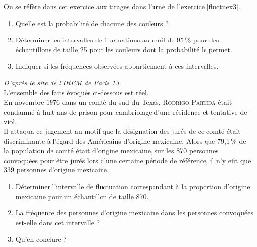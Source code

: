 \begin{exo}
 On se r\'ef\`ere dans cet exercice aux tirages dans l'urne de l'exercice \ref{fluctuex3}.
 \begin{enumerate}
  \item Quelle est la probabilit\'e de chacune des couleurs ?
  \item D\'eterminer les intervalles de fluctuations au seuil de 95\,\% pour des \'echantillons de taille 25 pour les couleurs dont la probabilit\'e le permet.
  \item Indiquer si les fr\'equences observ\'ees appartiennent \`a ces intervalles.
 \end{enumerate}

\end{exo}

\sautpage

\begin{exo}
 \emph{D'apr\`es le site de l'\href{http://dutarte.club.fr/Sitestat/affaire\%20castaneda.htm}{IREM de Paris 13}.}\\
L'ensemble des faits \'evoqu\'es ci-dessous est r\'eel.\\
En novembre 1976 dans un comt\'e du sud du Texas, \textsc{Rodrigo Partida} \'etait condamn\'e \`a huit ans de prison pour cambriolage d'une r\'esidence et tentative de viol.\\
Il attaqua ce jugement au motif que la d\'esignation des jur\'es de ce comt\'e \'etait discriminante \`a l'\'egard des Am\'ericains d'origine mexicaine. Alors que 79,1\,\% de la population de comt\'e \'etait d'origine mexicaine, sur les 870 personnes convoqu\'ees pour \^etre jur\'es lors d'une certaine p\'eriode de r\'ef\'erence, il n'y eût que 339 personnes d'origine mexicaine.
\begin{enumerate}
  \item D\'eterminer l'intervalle de fluctuation correspondant \`a la proportion d'origine mexicaine pour un \'echantillon de taille 870.
  \item La fr\'equence des personnes d'origine mexicaine dans les personnes convoqu\'ees est-elle dans cet intervalle ?
  \item Qu'en conclure ?
\end{enumerate}

\end{exo}


